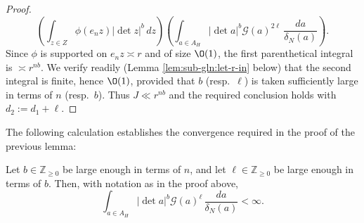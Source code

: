 \begin{proof}
  \begin{equation*}
    \left(
      \int_{z \in Z} \phi (e_n z) |\det z|^b  \, d z
    \right)
    \left(
      \int_{a \in A_H} |\det a|^b \mathcal{G}(a)^{2 \ell} \, \frac{d a}{ \delta_N(a)}
    \right).
  \end{equation*}
  Since $\phi$ is supported on $e_n z \asymp r$ and of size $\O(1)$, the first parenthetical integral is $\asymp r^{n b}$.  We verify readily (Lemma \ref{lem:sub-gln:let-r-in} below) that the second integral is finite, hence $\O(1)$, provided that $b$ (resp.\ $\ell$) is taken sufficiently large in terms of $n$ (resp.\ $b$).  Thus $J \ll r^{n b}$ and the required conclusion holds with $d_2 := d_1 + \ell$.
\end{proof}

The following calculation establishes the convergence required in the proof of the previous lemma:
\begin{lemma}\label{lem:sub-gln:let-r-in}
  Let $b \in \mathbb{Z}_{\geq 0}$ be large enough in terms of $n$, and let $\ell \in \mathbb{Z}_{\geq 0}$ be large enough in terms of $b$.  Then, with notation as in the proof above,
  \begin{equation*}
    \int_{a \in A_H} |\det a|^b \mathcal{G}(a)^{\ell} \, \frac{d a}{ \delta_N(a)} < \infty.
  \end{equation*}
\end{lemma}
